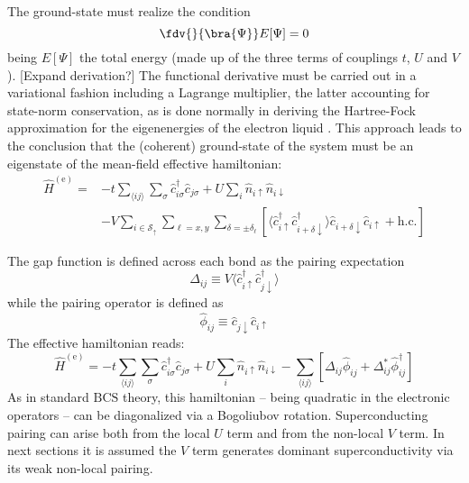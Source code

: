 The ground-state must realize the condition
\[
	\fdv{}{\bra{\Psi}} E[\Psi] = 0
\]
being $E[\Psi]$ the total energy (made up of the three terms of couplings $t$, $U$ and $V$). {\color{tabred}[Expand derivation?]} The functional derivative must be carried out in a variational fashion including a Lagrange multiplier, the latter accounting for state-norm conservation, as is done normally in deriving the Hartree-Fock approximation for the eigenenergies of the electron liquid \cite{grosso2014solid, giuliani2005quantum}. This approach leads to the conclusion that the (coherent) ground-state of the system must be an eigenstate of the mean-field effective hamiltonian:
\begin{equation}\label{eq:extended-hubbard-model-effective-intermediate}
	\begin{aligned}
		\hat H^{(\mathrm{e})} =
		&-t \sum_{\langle ij \rangle} \sum_\sigma \hat c_{i\sigma}^\dagger \hat c_{j\sigma}
		+ U \sum_i \hat n_{i\uparrow} \hat n_{i\downarrow} \\
		&- V \sum_{i \in \mathcal{S}_\uparrow} \sum_{\ell = x,y} \sum_{\delta = \pm \delta_\ell} \left[
			\langle 
				\hat c_{i\uparrow}^\dagger \hat c_{i + \delta \downarrow}^\dagger
			\rangle
			\hat c_{i + \delta \downarrow} \hat c_{i\uparrow} 
			+ \mathrm{h}.\mathrm{c}.
		\right]
	\end{aligned}
\end{equation}

The gap function is defined across each bond as the pairing expectation
\[
	\Delta_{ij} \equiv V \langle 
		\hat c_{i\uparrow}^\dagger \hat c_{j \downarrow}^\dagger
	\rangle
\]
while the pairing operator is defined as
\[
	\hat \phi_{ij} \equiv \hat c_{j\downarrow} \hat c_{i\uparrow}
\]
The effective hamiltonian reads:
\begin{equation}\label{eq:extended-hubbard-model-effective}
	\hat H^{(\mathrm{e})} =
	-t \sum_{\langle ij \rangle} \sum_\sigma \hat c_{i\sigma}^\dagger \hat c_{j\sigma}
	+ U \sum_i \hat n_{i\uparrow} \hat n_{i\downarrow}
	- \sum_{\langle ij \rangle} \left[
		\Delta_{ij} \hat \phi_{ij} + \Delta_{ij}^* \hat \phi_{ij}^\dagger
	\right]
\end{equation}
As in standard $\mathrm{BCS}$ theory, this hamiltonian -- being quadratic in the electronic operators -- can be diagonalized via a Bogoliubov rotation. Superconducting pairing can arise both from the local $U$ term and from the non-local $V$ term. In next sections it is assumed the $V$ term generates dominant superconductivity via its weak non-local pairing.

